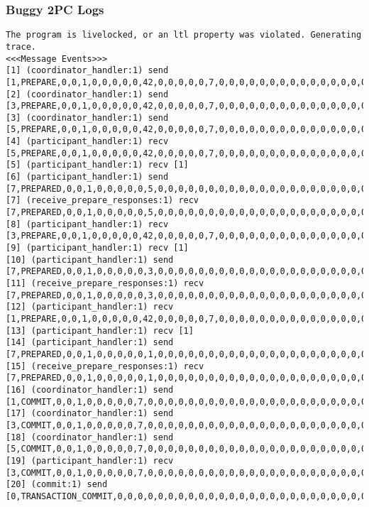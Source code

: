 \subsubsection{Buggy 2PC Logs}
\begin{lstlisting}[xleftmargin=.01\linewidth, xrightmargin=0.01\linewidth, caption={Message passing caused by the proposer's protocol bug.}, label={lst:paxos_bug}]
The program is livelocked, or an ltl property was violated. Generating trace.
<<<Message Events>>>
[1] (coordinator_handler:1) send [1,PREPARE,0,0,1,0,0,0,0,0,42,0,0,0,0,0,7,0,0,0,0,0,0,0,0,0,0,0,0,0,0,0,0,0,0,0,0,0]
[2] (coordinator_handler:1) send [3,PREPARE,0,0,1,0,0,0,0,0,42,0,0,0,0,0,7,0,0,0,0,0,0,0,0,0,0,0,0,0,0,0,0,0,0,0,0,0]
[3] (coordinator_handler:1) send [5,PREPARE,0,0,1,0,0,0,0,0,42,0,0,0,0,0,7,0,0,0,0,0,0,0,0,0,0,0,0,0,0,0,0,0,0,0,0,0]
[4] (participant_handler:1) recv [5,PREPARE,0,0,1,0,0,0,0,0,42,0,0,0,0,0,7,0,0,0,0,0,0,0,0,0,0,0,0,0,0,0,0,0,0,0,0,0]
[5] (participant_handler:1) recv [1]
[6] (participant_handler:1) send [7,PREPARED,0,0,1,0,0,0,0,0,5,0,0,0,0,0,0,0,0,0,0,0,0,0,0,0,0,0,0,0,0,0,0,0,0,0,0,0]
[7] (receive_prepare_responses:1) recv [7,PREPARED,0,0,1,0,0,0,0,0,5,0,0,0,0,0,0,0,0,0,0,0,0,0,0,0,0,0,0,0,0,0,0,0,0,0,0,0]
[8] (participant_handler:1) recv [3,PREPARE,0,0,1,0,0,0,0,0,42,0,0,0,0,0,7,0,0,0,0,0,0,0,0,0,0,0,0,0,0,0,0,0,0,0,0,0]
[9] (participant_handler:1) recv [1]
[10] (participant_handler:1) send [7,PREPARED,0,0,1,0,0,0,0,0,3,0,0,0,0,0,0,0,0,0,0,0,0,0,0,0,0,0,0,0,0,0,0,0,0,0,0,0]
[11] (receive_prepare_responses:1) recv [7,PREPARED,0,0,1,0,0,0,0,0,3,0,0,0,0,0,0,0,0,0,0,0,0,0,0,0,0,0,0,0,0,0,0,0,0,0,0,0]
[12] (participant_handler:1) recv [1,PREPARE,0,0,1,0,0,0,0,0,42,0,0,0,0,0,7,0,0,0,0,0,0,0,0,0,0,0,0,0,0,0,0,0,0,0,0,0]
[13] (participant_handler:1) recv [1]
[14] (participant_handler:1) send [7,PREPARED,0,0,1,0,0,0,0,0,1,0,0,0,0,0,0,0,0,0,0,0,0,0,0,0,0,0,0,0,0,0,0,0,0,0,0,0]
[15] (receive_prepare_responses:1) recv [7,PREPARED,0,0,1,0,0,0,0,0,1,0,0,0,0,0,0,0,0,0,0,0,0,0,0,0,0,0,0,0,0,0,0,0,0,0,0,0]
[16] (coordinator_handler:1) send [1,COMMIT,0,0,1,0,0,0,0,0,7,0,0,0,0,0,0,0,0,0,0,0,0,0,0,0,0,0,0,0,0,0,0,0,0,0,0,0]
[17] (coordinator_handler:1) send [3,COMMIT,0,0,1,0,0,0,0,0,7,0,0,0,0,0,0,0,0,0,0,0,0,0,0,0,0,0,0,0,0,0,0,0,0,0,0,0]
[18] (coordinator_handler:1) send [5,COMMIT,0,0,1,0,0,0,0,0,7,0,0,0,0,0,0,0,0,0,0,0,0,0,0,0,0,0,0,0,0,0,0,0,0,0,0,0]
[19] (participant_handler:1) recv [3,COMMIT,0,0,1,0,0,0,0,0,7,0,0,0,0,0,0,0,0,0,0,0,0,0,0,0,0,0,0,0,0,0,0,0,0,0,0,0]
[20] (commit:1) send [0,TRANSACTION_COMMIT,0,0,0,0,0,0,0,0,0,0,0,0,0,0,0,0,0,0,0,0,0,0,0,0,0,0,0,0,0,0,0,0,0,0,0,0]

\end{lstlisting}
